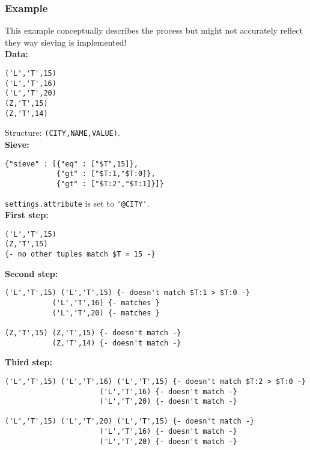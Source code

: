 \documentclass[12pt]{article}
\begin{document}
\subsubsection{Example}

This example conceptually describes the process but might not accurately reflect they way sieving is implemented! \\

\textbf{Data:} 

\begin{verbatim}
('L','T',15)
('L','T',16)
('L','T',20)
(Z,'T',15)
(Z,'T',14)
\end{verbatim}

Structure: \verb|(CITY,NAME,VALUE)|. \\

\textbf{Sieve:}

\begin{verbatim}
{"sieve" : [{"eq" : ["$T",15]},
            {"gt" : ["$T:1,"$T:0]},
            {"gt" : ["$T:2","$T:1]}]}
\end{verbatim}

\verb|settings.attribute| is set to \verb|'@CITY'|. \\

\textbf{First step:}

\begin{verbatim}
('L','T',15)
(Z,'T',15)
{- no other tuples match $T = 15 -}
\end{verbatim}

\textbf{Second step:}

\begin{verbatim}
('L','T',15) ('L','T',15) {- doesn't match $T:1 > $T:0 -}
           ('L','T',16) {- matches }
           ('L','T',20) {- matches }

(Z,'T',15) (Z,'T',15) {- doesn't match -}
           (Z,'T',14) {- doesn't match -}
\end{verbatim}

\textbf{Third step:}

\begin{verbatim}
('L','T',15) ('L','T',16) ('L','T',15) {- doesn't match $T:2 > $T:0 -}
                      ('L','T',16) {- doesn't match -}
                      ('L','T',20) {- doesn't match -}

('L','T',15) ('L','T',20) ('L','T',15) {- doesn't match -}
                      ('L','T',16) {- doesn't match -}
                      ('L','T',20) {- doesn't match -}                      
\end{verbatim}
\end{document}

